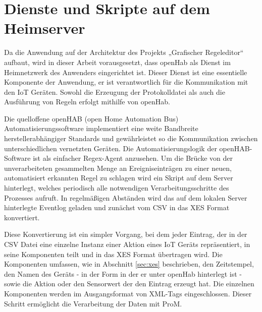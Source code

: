\section{Dienste und Skripte auf dem Heimserver}
Da die Anwendung auf der Architektur des Projekts „Grafischer Regeleditor“ aufbaut, wird in dieser Arbeit vorausgesetzt, dass openHab als Dienst im Heimnetzwerk des Anwenders eingerichtet ist. Dieser Dienst ist eine essentielle Komponente der Anwendung, er ist verantwortlich für die Kommunikation mit den IoT Geräten. Sowohl die Erzeugung der Protokolldatei als auch die Ausführung von Regeln erfolgt mithilfe von openHab. 

Die quelloffene openHAB (open Home Automation Bus) Automatisierungssoftware implementiert eine weite Bandbreite herstellerabhängiger Standards und gewährleistet so die Kommunikation zwischen unterschiedlichen vernetzten Geräten. Die Automatisierungslogik der openHAB-Software ist als einfacher Regex-Agent anzusehen. 
Um die Brücke von der unverarbeiteten gesammelten Menge an Ereigniseinträgen zu einer neuen, automatisiert erkannten Regel zu schlagen wird ein Skript auf dem Server hinterlegt, welches periodisch alle notwendigen Verarbeitungsschritte des Prozesses aufruft. In regelmäßigen Abständen wird das auf dem lokalen Server hinterlegte Eventlog geladen und zunächst vom CSV in das XES Format konvertiert. 

Diese Konvertierung ist ein simpler Vorgang, bei dem jeder Eintrag, der in der CSV Datei eine einzelne Instanz einer Aktion eines IoT Geräts repräsentiert, in seine Komponenten teilt und in das XES Format übertragen wird. Die Komponenten umfassen, wie in Abschnitt \ref{sec:xes} beschrieben, den Zeitstempel, den Namen des Geräts - in der Form in der er unter openHab hinterlegt ist - sowie die Aktion oder den Sensorwert der den Eintrag erzeugt hat. Die einzelnen Komponenten werden im Ausgangsformat von XML-Tags eingeschlossen. Dieser Schritt ermöglicht die Verarbeitung der Daten mit ProM.


